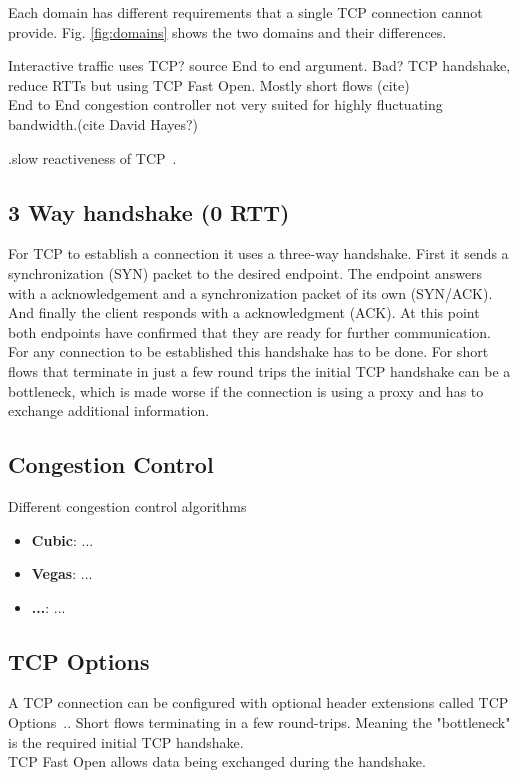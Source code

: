 \documentclass[a4paper,english, 11pt]{report}
\begin{document}
Each domain has different requirements that a single TCP connection cannot provide. Fig. \ref{fig:domains} shows the two domains and their differences.

Interactive traffic uses TCP? {source}
End to end argument. Bad?
TCP handshake, reduce RTTs but using TCP Fast Open. Mostly short flows (cite)
\\
End to End congestion controller not very suited for highly fluctuating bandwidth.(cite David Hayes?)

.slow reactiveness of TCP~\cite{tcp_mmwave_proxy}.

\subsection{3 Way handshake (0 RTT)}
For TCP to establish a connection it uses a three-way handshake. First it sends a synchronization (SYN) packet to the desired endpoint. The endpoint answers with a acknowledgement and a synchronization packet of its own (SYN/ACK). And finally the client responds with a acknowledgment (ACK). At this point both endpoints have confirmed that they are ready for further communication. For any connection to be established this handshake has to be done. For short flows that terminate in just a few round trips the initial TCP handshake can be a bottleneck, which is made worse if the connection is using a proxy and has to exchange additional information. 

\subsection{Congestion Control}

Different congestion control algorithms
\begin{itemize}
  \item \textbf{Cubic}: ...
  \item \textbf{Vegas}: ...
  \item \textbf{...}: ...
\end{itemize}

\subsection{TCP Options}
A TCP connection can be configured with optional header extensions called TCP Options~\cite{tcp_options}.. 
Short flows terminating in a few round-trips. Meaning the "bottleneck" is the required initial TCP handshake.\\
TCP Fast Open allows data being exchanged during the handshake. 
\end{document}
